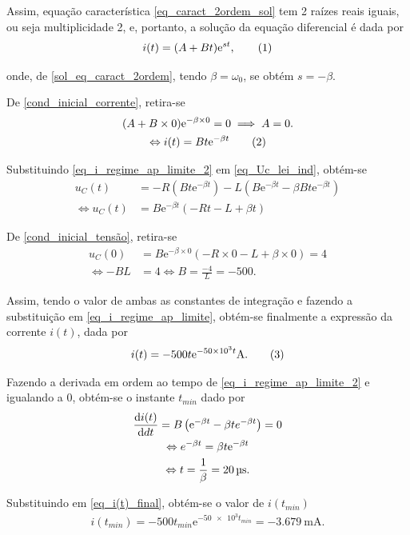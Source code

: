 \documentclass[a4paper, titlepage, portuguese]{article}
\newcommand{\eq}{\Leftrightarrow} %
\newcommand\numberthis{\addtocounter{equation}{1}\tag{\theequation}}
\newcommand\e{\mathrm{e} }
\begin{document}
		Assim, equação característica \eqref{eq_caract_2ordem_sol} tem 2 raízes reais iguais, ou seja multiplicidade 2, e, portanto, a solução da equação diferencial é dada por
		\begin{align*}
			i ( t ) = ( A + B t ) \e ^ { s t }, \numberthis \label{eq_i_regime_ap_limite}
		\end{align*}

		onde, de \eqref{sol_eq_caract_2ordem}, tendo $\beta = \omega_{0}$, se obtém $s = - \beta$.

		De \eqref{cond_inicial_corrente}, retira-se
		\begin{gather*}
			( A + B \times 0 ) \e ^ { - \beta \times 0 } = 0 \implies A = 0. \\ \eq
			i(t) = Bt\e^{-\beta t} \numberthis \label{eq_i_regime_ap_limite_2}
		\end{gather*}

		Substituindo \eqref{eq_i_regime_ap_limite_2} em \eqref{eq_Uc_lei_ind}, obtém-se
		\begin{align*}
			 u_C(t) &= -R\left(Bt\e^{-\beta t}\right) - L\left( B\e^{-\beta t} -\beta Bt\e^{-\beta t} \right) \\ \eq
			u_C(t)  &= B\e^{-\beta t} \left(  -Rt - L +\beta t  \right)
		\end{align*}

		De \eqref{cond_inicial_tensão}, retira-se
		\begin{align*}
			 u_C(0)  &= B\e^{-\beta \times 0} \left(  -R\times 0 - L +\beta \times 0  \right) = 4 \\ \eq
			 -BL &= 4 \eq B = \frac{-4}{L} = -500.
		\end{align*}

		Assim, tendo o valor de ambas as constantes de integração e fazendo a substituição em \eqref{eq_i_regime_ap_limite}, obtém-se finalmente a expressão da corrente $i(t)$, dada por
		\begin{align*}
			i(t) = -500t\e^{-\num{50e3}t} \si{\ampere}. \numberthis \label{eq_i(t)_final}
		\end{align*}

		Fazendo a derivada em ordem ao tempo de \eqref{eq_i_regime_ap_limite_2} e igualando a 0, obtém-se o instante $t_{min}$ dado por
		\begin{gather*}
			\dv{i(t)}{dt} = B\left( \e^{-\beta t} - \beta t e^{-\beta t}\right) = 0 \\ \eq
			e^{-\beta t} = \beta t\e^{-\beta t} \\ \eq
			t = \frac{1}{\beta} = \SI{20}{\micro\second}.
		\end{gather*}

		Substituindo em \eqref{eq_i(t)_final}, obtém-se o valor de $i(t_{min})$
		\begin{gather*}
			i(t_{min}) = -500t_{min}\e^{-\num{50e3}t_{min}} = \SI{-3.679}{\milli\ampere}.
		\end{gather*}


\end{document}
